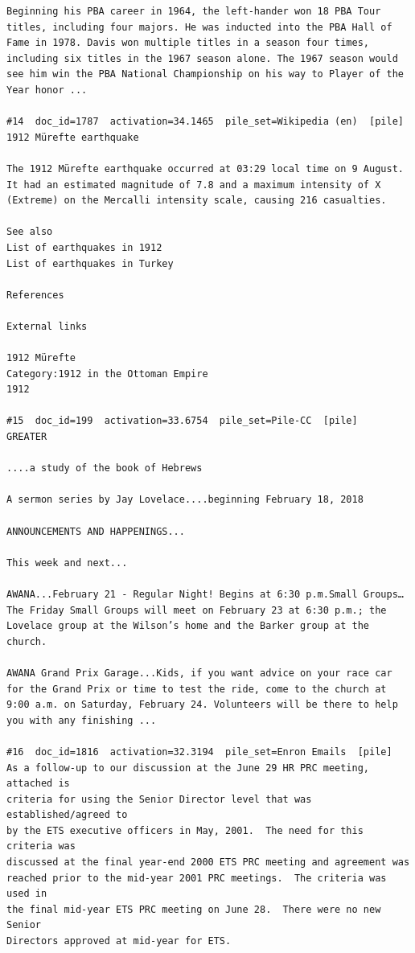 \begin{verbatim}
Beginning his PBA career in 1964, the left-hander won 18 PBA Tour titles, including four majors. He was inducted into the PBA Hall of Fame in 1978. Davis won multiple titles in a season four times, including six titles in the 1967 season alone. The 1967 season would see him win the PBA National Championship on his way to Player of the Year honor ...

#14  doc_id=1787  activation=34.1465  pile_set=Wikipedia (en)  [pile]
1912 Mürefte earthquake

The 1912 Mürefte earthquake occurred at 03:29 local time on 9 August. It had an estimated magnitude of 7.8 and a maximum intensity of X (Extreme) on the Mercalli intensity scale, causing 216 casualties.

See also
List of earthquakes in 1912
List of earthquakes in Turkey

References

External links

1912 Mürefte
Category:1912 in the Ottoman Empire
1912

#15  doc_id=199  activation=33.6754  pile_set=Pile-CC  [pile]
GREATER

....a study of the book of Hebrews

A sermon series by Jay Lovelace....beginning February 18, 2018

ANNOUNCEMENTS AND HAPPENINGS...

This week and next...

AWANA...February 21 - Regular Night! Begins at 6:30 p.m.Small Groups…The Friday Small Groups will meet on February 23 at 6:30 p.m.; the Lovelace group at the Wilson’s home and the Barker group at the church.

AWANA Grand Prix Garage...Kids, if you want advice on your race car for the Grand Prix or time to test the ride, come to the church at 9:00 a.m. on Saturday, February 24. Volunteers will be there to help you with any finishing ...

#16  doc_id=1816  activation=32.3194  pile_set=Enron Emails  [pile]
As a follow-up to our discussion at the June 29 HR PRC meeting, attached is 
criteria for using the Senior Director level that was established/agreed to 
by the ETS executive officers in May, 2001.  The need for this criteria was 
discussed at the final year-end 2000 ETS PRC meeting and agreement was 
reached prior to the mid-year 2001 PRC meetings.  The criteria was used in 
the final mid-year ETS PRC meeting on June 28.  There were no new Senior 
Directors approved at mid-year for ETS.


\end{verbatim}
